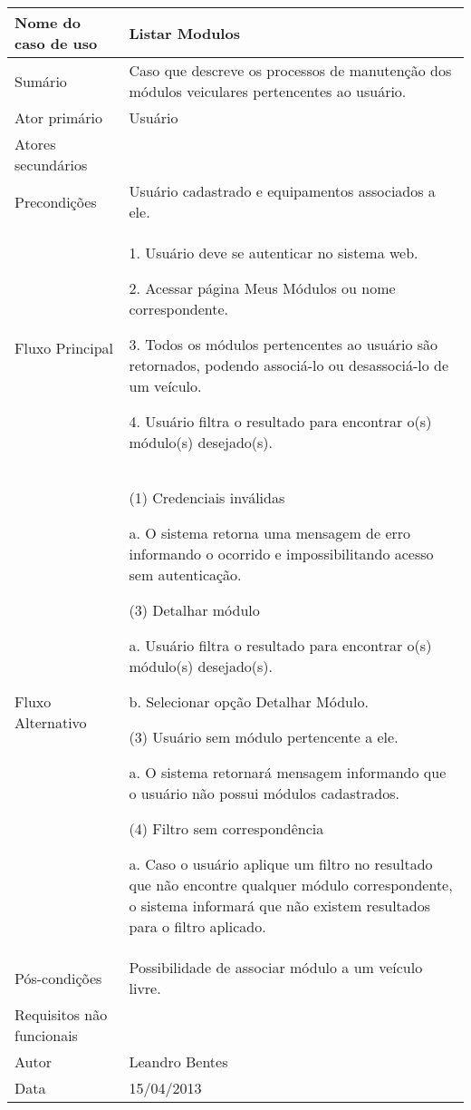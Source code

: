 \begin{flushleft}
\tablefirsthead{}
\tablehead{}
\tabletail{}
\tablelasttail{}
\begin{supertabular}{|m{5.5680003cm}|m{9.325cm}|}
\hline
Nome do caso de uso &
Listar Modulos\\\hline
Sumário &
Caso que descreve os processos de manutenção dos módulos veiculares pertencentes ao usuário. \\\hline
Ator primário &
Usuário\\\hline
Atores secundários &
~
\\\hline
Precondições &
Usuário cadastrado e equipamentos associados a ele.\\\hline
Fluxo Principal &
1. Usuário deve se autenticar no sistema web.

2. Acessar página Meus Módulos ou nome correspondente.

3. Todos os módulos pertencentes ao usuário são retornados, podendo associá-lo ou desassociá-lo de um veículo.

4. Usuário filtra o resultado para encontrar o(s) módulo(s) desejado(s).\\\hline
Fluxo Alternativo &
(1) Credenciais inválidas

a. O sistema retorna uma mensagem de erro informando o ocorrido e impossibilitando acesso sem autenticação.

(3) Detalhar módulo

a. Usuário filtra o resultado para encontrar o(s) módulo(s) desejado(s).

b. Selecionar opção Detalhar Módulo.

(3) Usuário sem módulo pertencente a ele.

a. O sistema retornará mensagem informando que o usuário não possui módulos cadastrados.

(4) Filtro sem correspondência

a. Caso o usuário aplique um filtro no resultado que não encontre qualquer módulo correspondente, o sistema informará que não existem resultados para o filtro aplicado.\\\hline
Pós-condições &
Possibilidade de associar módulo a um veículo livre.\\\hline
Requisitos não funcionais &
~\\\hline
Autor &
Leandro Bentes\\\hline
Data &
15/04/2013\\\hline
\end{supertabular}
\end{flushleft}
